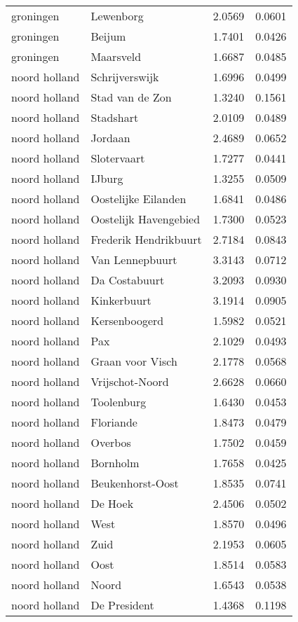 \begin{longtable}{llcc}
groningen & Lewenborg & 2.0569 & 0.0601 \\
groningen & Beijum & 1.7401 & 0.0426 \\
groningen & Maarsveld & 1.6687 & 0.0485 \\
noord holland & Schrijverswijk & 1.6996 & 0.0499 \\
noord holland & Stad van de Zon & 1.3240 & 0.1561 \\
noord holland & Stadshart & 2.0109 & 0.0489 \\
noord holland & Jordaan & 2.4689 & 0.0652 \\
noord holland & Slotervaart & 1.7277 & 0.0441 \\
noord holland & IJburg & 1.3255 & 0.0509 \\
noord holland & Oostelijke Eilanden & 1.6841 & 0.0486 \\
noord holland & Oostelijk Havengebied & 1.7300 & 0.0523 \\
noord holland & Frederik Hendrikbuurt & 2.7184 & 0.0843 \\
noord holland & Van Lennepbuurt & 3.3143 & 0.0712 \\
noord holland & Da Costabuurt & 3.2093 & 0.0930 \\
noord holland & Kinkerbuurt & 3.1914 & 0.0905 \\
noord holland & Kersenboogerd & 1.5982 & 0.0521 \\
noord holland & Pax & 2.1029 & 0.0493 \\
noord holland & Graan voor Visch & 2.1778 & 0.0568 \\
noord holland & Vrijschot-Noord & 2.6628 & 0.0660 \\
noord holland & Toolenburg & 1.6430 & 0.0453 \\
noord holland & Floriande & 1.8473 & 0.0479 \\
noord holland & Overbos & 1.7502 & 0.0459 \\
noord holland & Bornholm & 1.7658 & 0.0425 \\
noord holland & Beukenhorst-Oost & 1.8535 & 0.0741 \\
noord holland & De Hoek & 2.4506 & 0.0502 \\
noord holland & West & 1.8570 & 0.0496 \\
noord holland & Zuid & 2.1953 & 0.0605 \\
noord holland & Oost & 1.8514 & 0.0583 \\
noord holland & Noord & 1.6543 & 0.0538 \\
noord holland & De President & 1.4368 & 0.1198 \\

\end{longtable}
